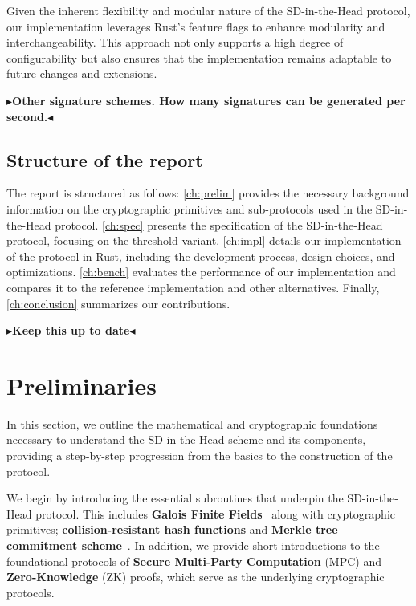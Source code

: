\documentclass[twoside,11pt]{report}
\theoremstyle{definition}
\theoremstyle{plain}
\newcommand{\todo}[1]{{\color[rgb]{.5,0,0}\textbf{$\blacktriangleright$#1$\blacktriangleleft$}}}
\begin{document}
Given the inherent flexibility and modular nature of the SD-in-the-Head protocol, our implementation leverages Rust's feature flags to enhance modularity and interchangeability. This approach not only supports a high degree of configurability but also ensures that the implementation remains adaptable to future changes and extensions.

\todo{Other signature schemes. How many signatures can be generated per second.}

\section{Structure of the report}
The report is structured as follows: \autoref{ch:prelim} provides the necessary background information on the cryptographic primitives and sub-protocols used in the SD-in-the-Head protocol. \autoref{ch:spec} presents the specification of the SD-in-the-Head protocol, focusing on the threshold variant. \autoref{ch:impl} details our implementation of the protocol in Rust, including the development process, design choices, and optimizations. \autoref{ch:bench} evaluates the performance of our implementation and compares it to the reference implementation and other alternatives. Finally, \autoref{ch:conclusion} summarizes our contributions.

\todo{Keep this up to date}


\chapter{Preliminaries}\label{ch:prelim}

In this section, we outline the mathematical and cryptographic foundations necessary to understand the SD-in-the-Head scheme and its components, providing a step-by-step progression from the basics to the construction of the protocol.

We begin by introducing the essential subroutines that underpin the SD-in-the-Head protocol. This includes \textbf{Galois Finite Fields}~\cite{martinez2023syndromes, reed1960polynomial, brownadvanced} along with cryptographic primitives; \textbf{collision-resistant hash functions} and \textbf{Merkle tree commitment scheme}~\cite{becker2008merkle}. In addition, we provide short introductions to the foundational protocols of \textbf{Secure Multi-Party Computation} (MPC) and \textbf{Zero-Knowledge} (ZK) proofs, which serve as the underlying cryptographic protocols.
\end{document}
